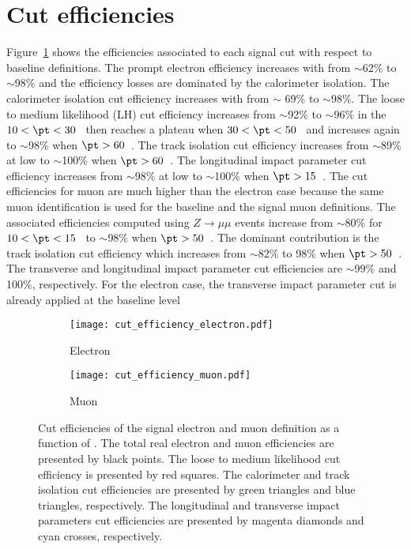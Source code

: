 \section{Cut efficiencies}
\label{sec:app_RLE_cut_efficiencies}
Figure~\ref{fig:app_RLE_cut_efficiencies} shows the efficiencies associated to each signal cut with respect to baseline definitions.
The prompt electron efficiency increases with \pt from $\sim$62\% to $\sim$98\% and the efficiency losses are dominated by the calorimeter isolation.
The calorimeter isolation cut efficiency increases with \pt from $\sim$ 69\% to $\sim$98\%.
The loose to medium likelihood (LH) cut efficiency increases from $\sim$92\% to $\sim$96\% in the $10< \pt < 30$~{\GeV} then reaches a plateau when $30 < \pt < 50$~{\GeV} and increases again to $\sim$98\% when $\pt > 60$~{\GeV}.
The track isolation cut efficiency increases from $\sim$89\% at low \pt to $\sim$100\% when $\pt > 60$~{\GeV}.
The longitudinal impact parameter cut efficiency increases from $\sim$98\% at low \pt to $\sim$100\% when $\pt > 15$~{\GeV}.
The cut efficiencies for muon are much higher than the electron case because the same muon identification is used for the baseline and the signal muon definitions.
The associated efficiencies computed using $Z\to \mu \mu$ events increase from $\sim$80\% for $10 < \pt < 15$~{\GeV} to $\sim$98\% when $\pt > 50$~{\GeV}.
The dominant contribution is the track isolation cut efficiency which increases from $\sim$82\% to 98\% when $\pt > 50$~{\GeV}.
The transverse and longitudinal impact parameter cut efficiencies are $\sim$99\% and 100\%, respectively.
For the electron case, the transverse impact parameter cut is already applied at the baseline level

\begin{figure}[htbp]
    \begin{subfigure}[b]{0.48\textwidth}
        \begin{center}
            \texttt{[image: cut\_efficiency\_electron.pdf]}
            \caption{Electron}
        \end{center}
    \end{subfigure}
    \begin{subfigure}[b]{0.48\textwidth}
        \begin{center}
            \texttt{[image: cut\_efficiency\_muon.pdf]}
            \caption{Muon}
        \end{center}
    \end{subfigure}
    \caption{Cut efficiencies of the signal electron and muon definition as a function of \pt.
    The total real electron and muon efficiencies are presented by black points. 
    The loose to medium likelihood cut efficiency is presented by red squares.
    The calorimeter and track isolation cut efficiencies are presented by green triangles and blue triangles, respectively.
    The longitudinal and transverse impact parameters cut efficiencies are presented by magenta diamonds and cyan crosses, respectively.}
    \label{fig:app_RLE_cut_efficiencies}
\end{figure}

